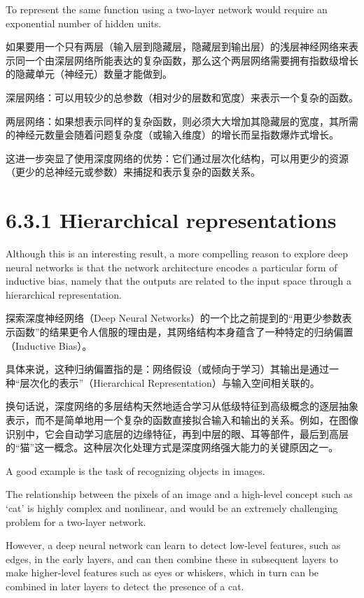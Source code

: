 \documentclass{article}
\begin{document}
To represent the same function using a two-layer network would require an exponential number of hidden units.

{\color{red}
如果要用一个只有两层（输入层到隐藏层，隐藏层到输出层）的浅层神经网络来表示同一个由深层网络所能表达的复杂函数，那么这个两层网络需要拥有指数级增长的隐藏单元（神经元）数量才能做到。

深层网络：可以用较少的总参数（相对少的层数和宽度）来表示一个复杂的函数。

两层网络：如果想表示同样的复杂函数，则必须大大增加其隐藏层的宽度，其所需的神经元数量会随着问题复杂度（或输入维度）的增长而呈指数爆炸式增长。

这进一步突显了使用深度网络的优势：它们通过层次化结构，可以用更少的资源（更少的总神经元或参数）来捕捉和表示复杂的函数关系。
}

\section{6.3.1 Hierarchical representations}

Although this is an interesting result, a more compelling reason to explore deep neural networks is that the network architecture encodes a particular form of inductive bias, namely that the outputs are related to the input space through a hierarchical representation. 

{\color{red}
探索深度神经网络（Deep Neural Networks）的一个比之前提到的“用更少参数表示函数”的结果更令人信服的理由是，其网络结构本身蕴含了一种特定的归纳偏置（Inductive Bias）。

具体来说，这种归纳偏置指的是：网络假设（或倾向于学习）其输出是通过一种“层次化的表示”（Hierarchical Representation）与输入空间相关联的。

换句话说，深度网络的多层结构天然地适合学习从低级特征到高级概念的逐层抽象表示，而不是简单地用一个复杂的函数直接拟合输入和输出的关系。例如，在图像识别中，它会自动学习底层的边缘特征，再到中层的眼、耳等部件，最后到高层的“猫”这一概念。这种层次化处理方式是深度网络强大能力的关键原因之一。
}

A good example is the task of recognizing objects in images. 

The relationship between the pixels of an image and a high-level concept such as `cat' is highly complex and nonlinear, and would be an extremely challenging problem for a two-layer network. 

However, a deep neural network can learn to detect low-level features, such as edges, in the early layers, and can then combine these in subsequent layers to make higher-level features such as eyes or whiskers, which in turn can be combined in later layers to detect the presence of a cat. 
\end{document}
